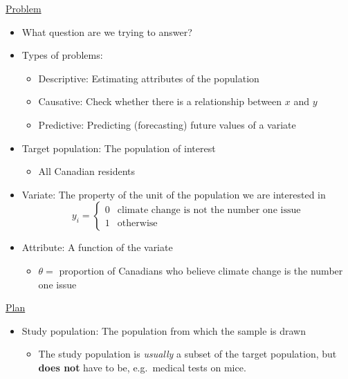 \underline{Problem}
\begin{itemize}
    \item What question are we trying to answer?
    \item Types of problems:
          \begin{itemize}
              \item Descriptive: Estimating attributes of the population
              \item Causative: Check whether there is a relationship between $ x $ and $ y $
              \item Predictive: Predicting (forecasting) future values of a variate
          \end{itemize}
    \item Target population: The population of interest
          \begin{itemize}
              \item All Canadian residents
          \end{itemize}
    \item Variate: The property of the unit of the population we are interested in
          \[ y_i=
              \begin{cases}
                  0 & \text{climate change is not the number one issue} \\
                  1 & \text{otherwise}
              \end{cases} \]
    \item Attribute: A function of the variate
          \begin{itemize}
              \item $ \theta= $ proportion of Canadians who believe climate change is the number one issue
          \end{itemize}
\end{itemize}
\underline{Plan}
\begin{itemize}
    \item Study population: The population from which the sample is drawn
          \begin{itemize}
              \item The study population is \emph{usually} a subset of the target population, but
                    \textbf{does not} have to be, e.g.\ medical tests on mice.
          \end{itemize}
\end{itemize}

